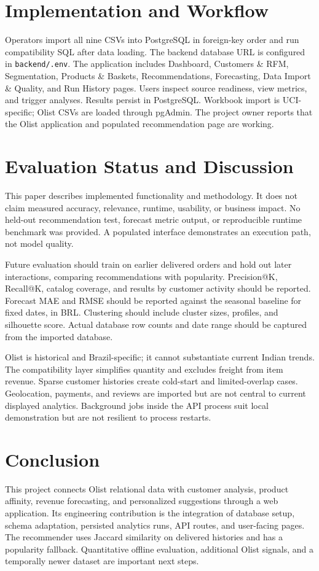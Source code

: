 \documentclass[conference]{IEEEtran}
\begin{document}
\section{Implementation and Workflow}
Operators import all nine CSVs into PostgreSQL in foreign-key order and run compatibility SQL after data loading. The backend database URL is configured in \texttt{backend/.env}. The application includes Dashboard, Customers \& RFM, Segmentation, Products \& Baskets, Recommendations, Forecasting, Data Import \& Quality, and Run History pages. Users inspect source readiness, view metrics, and trigger analyses. Results persist in PostgreSQL. Workbook import is UCI-specific; Olist CSVs are loaded through pgAdmin. The project owner reports that the Olist application and populated recommendation page are working.
\section{Evaluation Status and Discussion}
This paper describes implemented functionality and methodology. It does not claim measured accuracy, relevance, runtime, usability, or business impact. No held-out recommendation test, forecast metric output, or reproducible runtime benchmark was provided. A populated interface demonstrates an execution path, not model quality.

Future evaluation should train on earlier delivered orders and hold out later interactions, comparing recommendations with popularity. Precision@K, Recall@K, catalog coverage, and results by customer activity should be reported. Forecast MAE and RMSE should be reported against the seasonal baseline for fixed dates, in BRL. Clustering should include cluster sizes, profiles, and silhouette score. Actual database row counts and date range should be captured from the imported database.

Olist is historical and Brazil-specific; it cannot substantiate current Indian trends. The compatibility layer simplifies quantity and excludes freight from item revenue. Sparse customer histories create cold-start and limited-overlap cases. Geolocation, payments, and reviews are imported but are not central to current displayed analytics. Background jobs inside the API process suit local demonstration but are not resilient to process restarts.
\section{Conclusion}
This project connects Olist relational data with customer analysis, product affinity, revenue forecasting, and personalized suggestions through a web application. Its engineering contribution is the integration of database setup, schema adaptation, persisted analytics runs, API routes, and user-facing pages. The recommender uses Jaccard similarity on delivered histories and has a popularity fallback. Quantitative offline evaluation, additional Olist signals, and a temporally newer dataset are important next steps.
\end{document}

